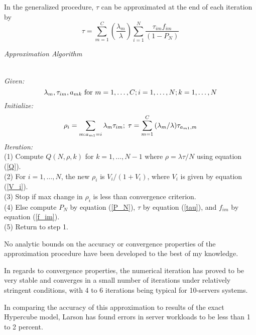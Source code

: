 In the generalized procedure, $\tau$ can be approximated at the end of each iteration by
\begin{equation} \label{tau}
  \tau = \sum_{m=1}^{C}{\left(\frac{\lambda_m}{\lambda}\right)\sum_{i=1}^{N}{\frac{\tau_{im}f_{im}}{(1-P_N)}}}
\end{equation}

{\footnotesize
  \begin{center}
    \textit{ Approximation Algorithm}
  \end{center}
  \vspace{-8pt}
  \hline \\
  \vspace{2pt}
  \textit{Given:}
  \begin{equation*}
    \lambda_m,\tau_{im},a_{mk}\mbox{  for } m = 1,\ldots,C;i=1,\ldots,N;k=1,\ldots,N \hfill
  \end{equation*}
  \textit{Initialize:}
  \begin{equation*}
    \rho_i = \sum_{m: a_{m1} = i}{\lambda_m \tau_{im}}; \; \tau = \sum_{m=1}^{C}{(\lambda_m/\lambda)\tau_{a_{m1},m}} \hfill
  \end{equation*}
  \textit{Iteration:}\\
  (1) Compute $Q(N,\rho,k)$ for $k = 1,\ldots,N-1$ where $\rho = \lambda \tau / N$ using equation (\ref{Q}). \\
  (2) For $i = 1,\ldots,N$, the new $\rho_i$ is $V_i/(1+V_i)$, where $V_i$ is given by equation (\ref{V_i}). \\
  (3) Stop if max change in $\rho_i$ is less than convergence criterion. \\
  (4) Else compute $P_N$ by equation (\ref{P_N}), $\tau$ by equation (\ref{tau}), and $f_{im}$ by equation (\ref{f_im}). \\
  (5) Return to step 1. \\
  \hline
}

No analytic bounds
on the accuracy or convergence properties
of the approximation procedure
have been developed
to the best of my knowledge.

In regards to convergence properties,
the numerical iteration
has proved to be very stable
and converges in a small number of iterations
under relatively stringent conditions,
with 4 to 6 iterations
being typical for 10-servers systems.

In comparing the accuracy of this approximation
to results of the exact Hypercube model,
Larson has found errors in server workloads
to be less than 1 to 2 percent.
